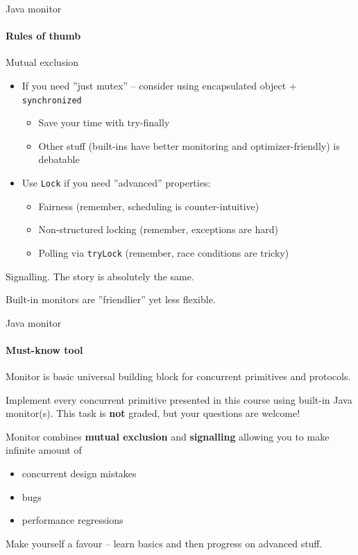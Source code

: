 \begin{frame}{Java monitor}
\framesubtitle{Rules of thumb}

Mutual exclusion
\begin{itemize}
    \item If you need ''just mutex'' -- consider using encapsulated object + \texttt{synchronized}
    \begin{itemize}
        \item Save your time with try-finally
        \item Other stuff (built-ins have better monitoring and optimizer-friendly) is debatable
    \end{itemize}

    \pause

    \item Use \texttt{Lock} if you need ''advanced'' properties:
    \begin{itemize}
        \item Fairness (remember, scheduling is counter-intuitive)
        \item Non-structured locking (remember, exceptions are hard)
        \item Polling via \texttt{tryLock} (remember, race conditions are tricky)
    \end{itemize}
\end{itemize}

\pause
Signalling\pause. The story is absolutely the same.

Built-in monitors are ''friendlier'' yet less flexible.

\end{frame}

\begin{frame}{Java monitor}
\framesubtitle{Must-know tool}

Monitor is basic universal building block for concurrent primitives and protocols.

\pause

\begin{homeworkmail}{}{
    Implement every concurrent primitive presented in this course using built-in Java monitor(s). This task is \textbf{not} graded, but your questions are welcome!
}
\end{homeworkmail}

\pause

Monitor combines \textbf{mutual exclusion} and \textbf{signalling} allowing you to make infinite amount of 
\begin{itemize}
    \pause
    \item concurrent design mistakes
    \pause
    \item bugs 
    \pause
    \item performance regressions
\end{itemize}

\pause

Make yourself a favour -- learn basics and then progress on advanced stuff.

\end{frame}

